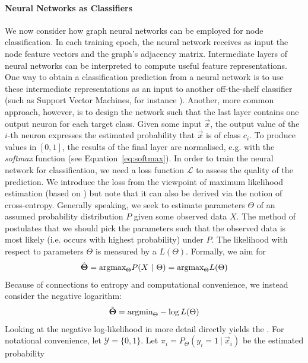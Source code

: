 \documentclass[
	fontsize=10pt, %
	twoside=false, %
	secnumdepth=1, %
  toc=indentunnumbered %
]{kaobook}
\begin{document}
\paragraph{Neural Networks as Classifiers} We now consider how graph neural
networks can be employed for node classification. In each training epoch, the
neural network receives as input the node feature vectors and the graph's
adjacency matrix.
%
Intermediate layers of neural
networks can be interpreted to compute useful feature representations. One way
to obtain a classification prediction from a neural network is to use these
intermediate representations as an input to another off-the-shelf classifier
(such as Support Vector Machines, for instance
\cite{liu_CombiningConvolutionalNeural_2018}). Another, more common approach,
however, is to design the network such that the last layer contains one output
neuron for each target class. Given some input $\vec x$, the output value of the
$i$-th neuron expresses the estimated probability that $\vec x$ is of class
$c_i$. To produce values in $[0,1]$, the results of the final layer are
normalised, e.g. with the \textit{softmax} function (see Equation~\ref{eq:softmax}).
%
In order to train the neural network for classification, we need a loss function
$\mathcal{L}$ to assess the quality of the prediction. We introduce the
 loss from the viewpoint of maximum likelihood
estimation (based on \cite{zhang_dive_nodate}) but note that it can also be
derived via the notion of cross-entropy.
%
Generally speaking, we seek to estimate parameters $\Theta$ of an assumed
probability distribution $P$ given some observed data $X$. The method of
 postulates that we should pick the
parameters such that the observed data is most likely (i.e. occurs with highest
probability) under $P$. The likelihood with respect to parameters $\Theta$ is measured by
a  $L(\Theta)$.
Formally, we aim for
\begin{align*}
  \hat \Theta = \argmax_\Theta P(X~|~\Theta) = \argmax_\Theta L(\Theta)
\end{align*}
Because of connections to entropy and computational convenience, we instead
consider the negative logarithm:
\begin{align*}
  \hat \Theta = \argmin_\Theta -\log L(\Theta)
\end{align*}
Looking at the negative log-likelihood in more detail directly yields the
.
For notational convenience, let $\mathcal{Y} =
\{0,1\}$. Let $\pi_i = P_\Theta(y_i=1~|~\vec x_i)$ be the estimated probability
\end{document}
